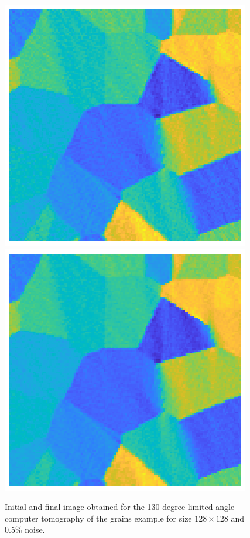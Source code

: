 \begin{figure}[htbp]
\begin{center}
\includegraphics{figures/limited_angle_grains_initial}\includegraphics{figures/limited_angle_grains_final}
\caption{Initial and final image obtained for the 130-degree limited angle computer tomography of the grains example for size $128 \times 128$ and 0.5\% noise.}
\label{fig:limited_angle_grains_initial_and_final}
\end{center}
\end{figure}


